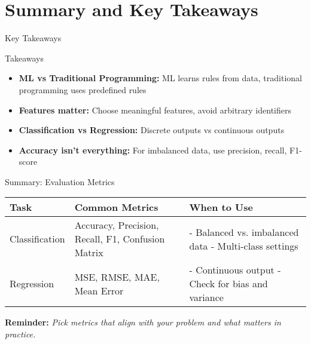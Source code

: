 \documentclass[usenames,dvipsnames]{beamer}
\begin{document}
\section{Summary and Key Takeaways}


\begin{frame}{Key Takeaways}
\begin{keypointsbox}{Takeaways}
\begin{itemize}
	\item \textbf{ML vs Traditional Programming:} ML learns rules from data, traditional programming uses predefined rules
	\item \textbf{Features matter:} Choose meaningful features, avoid arbitrary identifiers
	\item \textbf{Classification vs Regression:} Discrete outputs vs continuous outputs
	\item \textbf{Accuracy isn't everything:} For imbalanced data, use precision, recall, F1-score
\end{itemize}
\end{keypointsbox}
\end{frame}

\begin{frame}{Summary: Evaluation Metrics}

\scriptsize
\begin{center}
\renewcommand{\arraystretch}{1.3}
\begin{tabular}{|p{2cm}|p{3.5cm}|p{4cm}|}
\hline
\textbf{Task} & \textbf{Common Metrics} & \textbf{When to Use} \\
\hline
Classification & Accuracy, Precision, Recall, F1, Confusion Matrix & 
- Balanced vs. imbalanced data \newline
- Multi-class settings \\
\hline
Regression & MSE, RMSE, MAE, Mean Error & 
- Continuous output \newline
- Check for bias and variance \\
\hline
\end{tabular}
\end{center}

\vspace{0.6cm}
\textbf{Reminder:} \textit{Pick metrics that align with your problem and what matters in practice.}
\end{frame}
\end{document}

